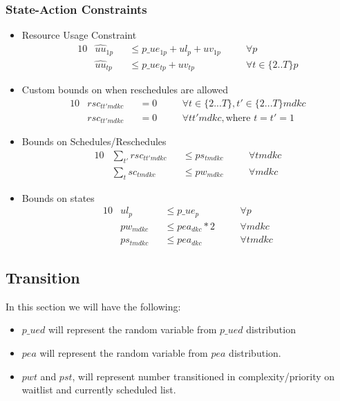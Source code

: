 \subsubsection{State-Action Constraints}
\label{state-action constraints}
\begin{itemize}
	
	\item Resource Usage Constraint
	\begin{alignat}{10}
		& \hat{uu}_{1p} 
			&& \le p\_ue_{1p} + ul_{p} + uv_{1p} \quad 
			&& \forall p \\
		& \hat{uu}_{tp} 
			&& \le p\_ue_{tp} + uv_{tp} \quad
			&& \forall t \in \{ 2..T \}p 
	\end{alignat}
	
	\item Custom bounds on when reschedules are allowed
	\begin{alignat}{10}
		& rsc_{tt'mdkc} && = 0 \quad && \forall t \in \{ 2...T \}, t' \in \{2...T\} mdkc \\
		& rsc_{tt'mdkc} && = 0 \quad && \forall tt'mdkc, \text{where } t=t'=1 
	\end{alignat}  
	
	\item Bounds on Schedules/Reschedules
	\begin{alignat}{10}
		& \sum_{t'} rsc_{tt'mdkc} 	&& \le ps_{tmdkc} \quad  && \forall tmdkc  \\
		& \sum_{t} sc_{tmdkc} 		&& \le pw_{mdkc} \quad 	&& \forall mdkc 
	\end{alignat}  
	
	\item Bounds on states
	\begin{alignat}{10}
		& ul_{p} 	&& \le p\_ue_{p} \quad 			&& \forall p \\
		& pw_{mdkc} 	&& \le pea_{dkc} * 2 \quad 			&& \forall mdkc \\
		& ps_{tmdkc} && \le pea_{dkc} \quad 			&& \forall tmdkc
	\end{alignat}
\end{itemize}

\subsection{Transition}

In this section we will have the following:
\begin{itemize}
	\item $p\_ued$ will represent the random variable from $p\_ued$ distribution 
	\item $pea$ will represent the random variable from $pea$ distribution. 
	\item $pwt$ and $pst$, will represent number transitioned in complexity/priority on waitlist and currently scheduled list.
\end{itemize}


